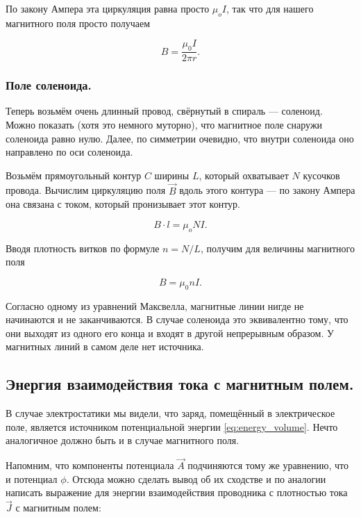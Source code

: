 \documentclass[11pt,a4paper]{article}
\numberwithin{equation}{section}
\begin{document}
По закону Ампера эта циркуляция равна просто $\mu_o I$, так что для
нашего магнитного поля просто получаем

\begin{equation}
  \label{eq:mfield_thin_current_2}
  B =  \frac{\mu_0 I}{2\pi r}.
\end{equation}

\subsubsection{Поле соленоида.}
\label{sec:mfield_solenoid}

Теперь возьмём очень длинный провод, свёрнутый в спираль ---
соленоид. Можно показать (хотя это немного муторно), что магнитное
поле снаружи соленоида равно нулю. Далее, по симметрии очевидно, что
внутри соленоида оно направлено по оси соленоида. 

Возьмём прямоугольный контур $C$ ширины $L$, который охватывает $N$
кусочков провода. Вычислим циркуляцию поля $\vec{B}$ вдоль этого
контура --- по закону Ампера она связана с током, который пронизывает
этот контур. 

\begin{equation}
  \label{eq:der_mfield_solenoid}
  B \cdot l = \mu_o N I.
\end{equation}

Вводя плотность витков по формуле $n = N/L$, получим для величины
магнитного поля

\begin{equation}
  \label{eq:mfield_solenoid}
  B = \mu_0 n I.
\end{equation}

Согласно одному из уравнений Максвелла, магнитные линии нигде не
начинаются и не заканчиваются. В случае соленоида это эквивалентно
тому, что они выходят из одного его конца и входят в другой
непрерывным образом. У магнитных линий в самом деле нет источника. 

\subsection{Энергия взаимодействия тока с магнитным полем. }
\label{sec:magnet_energy}

В случае электростатики мы видели, что заряд, помещённый в
электрическое поле, является источником потенциальной энергии
\eqref{eq:energy_volume}. Нечто аналогичное должно быть и в случае
магнитного поля. 

Напомним, что компоненты потенциала $\vec{A}$ подчиняются тому же
уравнению, что и потенциал $\phi$. Отсюда можно сделать вывод об их
сходстве и по аналогии написать выражение для энергии взаимодействия
проводника с плотностью тока $\vec{J}$ с магнитным полем: 
\end{document}
